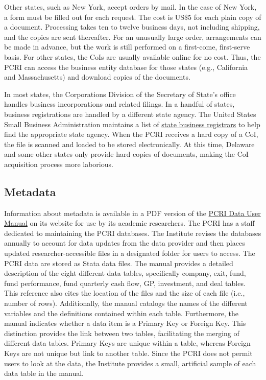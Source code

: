 

Other states, such as New York, accept orders by mail. In the case of New York, a form must be filled out for each request. The cost is US\$5 for each plain copy of a document. Processing takes ten to twelve business days, not including shipping, and the copies are sent thereafter. For an unusually large order, arrangements can be made in advance, but the work is still performed on a first-come, first-serve basis. For other states, the CoIs are usually available online for no cost. Thus, the PCRI can access the business entity database for those states (e.g., California and Massachusetts) and download copies of the documents.

In most states, the Corporations Division of the Secretary of State's office handles business incorporations and related filings. In a handful of states, business registrations are handled by a different state agency. The United States Small Business Administration maintains a list of \href{https://www.sba.gov/business-guide/launch-your-business/register-your-business\#section-header-6}{state business registrars} to help find the appropriate state agency. When the PCRI receives a hard copy of a CoI, the file is scanned and loaded to be stored electronically. At this time, Delaware and some other states only provide hard copies of documents, making the CoI acquisition process more laborious.

\hypertarget{metadata-1}{%
\subsection{Metadata}\label{metadata-1}}

Information about metadata is available in a PDF version of the \href{http://privatecapitalresearchinstitute.org/images/news/pcri_manual_2_4.pdf}{PCRI Data User Manual} on its website for use by its academic researchers. The PCRI has a staff dedicated to maintaining the PCRI databases. The Institute revises the databases annually to account for data updates from the data provider and then places updated researcher-accessible files in a designated folder for users to access. The PCRI data are stored as Stata data files. The manual provides a detailed description of the eight different data tables, specifically company, exit, fund, fund performance, fund quarterly cash flow, GP, investment, and deal tables. This reference also cites the location of the files and the size of each file (i.e., number of rows). Additionally, the manual catalogs the names of the different variables and the definitions contained within each table. Furthermore, the manual indicates whether a data item is a Primary Key or Foreign Key. This distinction provides the link between two tables, facilitating the merging of different data tables. Primary Keys are unique within a table, whereas Foreign Keys are not unique but link to another table. Since the PCRI does not permit users to look at the data, the Institute provides a small, artificial sample of each data table in the manual.

